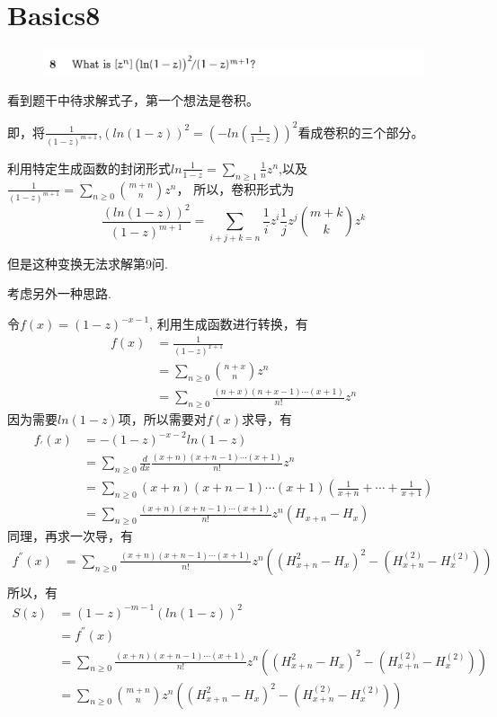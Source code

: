 \documentclass[]{article}
\begin{document}
\section*{Basics8}
\begin{figure}[H]
\includegraphics[scale = 0.3]{2023-04-20-12-38-00.png}
\end{figure}
看到题干中待求解式子，第一个想法是卷积。\par 
即，将$\frac{1}{(1-z)^{m+1}}$,$(ln(1-z))^2=(-ln(\frac{1}{1-z}))^2$看成卷积的三个部分。\par 
利用特定生成函数的封闭形式$ln\frac{1}{1-z}=\sum_{n\ge 1}\frac{1}{n}z^n$,以及$\frac{1}{(1-z)^{m+1}}=\sum_{n\ge 0}\binom{m+n}{n}z^n$，
所以，卷积形式为
\begin{equation}
    \frac{(ln(1-z))^2}{(1-z)^{m+1}}=\sum_{i+j+k=n}\frac{1}{i}z^i\frac{1}{j}z^j\binom{m+k}{k}z^k
\end{equation}
\par 
但是这种变换无法求解第9问.
\par 
考虑另外一种思路.
\par 
令$f(x) = (1-z)^{-x-1}$,
利用生成函数进行转换，有
\begin{align}
    f(x)&=\frac{1}{(1-z)^{x+1}}\\
    &=\sum_{n\ge 0}\binom{n+x}{n}z^n\\
    &=\sum_{n\ge 0}\frac{(n+x)(n+x-1)\cdots(x+1)}{n!}z^n
\end{align}
因为需要$ln(1-z)$项，所以需要对$f(x)$求导，有
\begin{align}
    f_{'}(x)&=-(1-z)^{-x-2}ln(1-z)\\
    &=\sum_{n\ge 0}\frac{d}{dx}\frac{(x+n)(x+n-1)\cdots (x+1)}{n!}z^n\\
    &=\sum_{n\ge 0}{(x+n)(x+n-1)\cdots (x+1)}(\frac{1}{x+n} + \cdots + \frac{1}{x+1})\\
    &=\sum_{n\ge 0}\frac{(x+n)(x+n-1)\cdots(x+1)}{n!}z^n(H_{x+n}-H_{x})
\end{align}
同理，再求一次导，有
\begin{align}
    f^{''}(x) &= \sum_{n\ge 0}\frac{(x+n)(x+n-1)\cdots(x+1)}{n!}z^n((H_{x+n}^2-H_{x})^2 - (H^{(2)}_{x+n}-H^{(2)}_{x}))\\
\end{align}
所以，有
\begin{align}
    S(z) &= (1-z)^{-m-1}(ln(1-z))^2\\
    &= f^{''}(x)\\
    &= \sum_{n\ge 0}\frac{(x+n)(x+n-1)\cdots(x+1)}{n!}z^n((H_{x+n}^2-H_{x})^2 - (H^{(2)}_{x+n}-H^{(2)}_{x}))\\
    &=\sum_{n\ge 0}\binom{m+n}{n}z^n((H_{x+n}^2-H_{x})^2 - (H^{(2)}_{x+n}-H^{(2)}_{x}))\\
\end{align}
\end{document}
